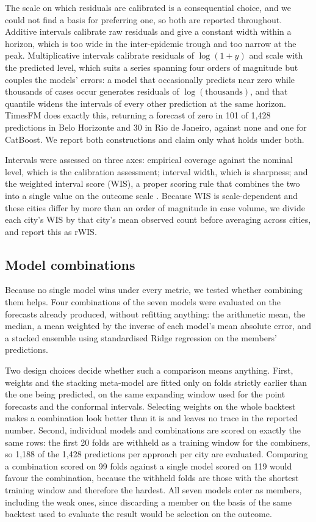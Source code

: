 \documentclass[11pt]{article}
\begin{document}
The scale on which residuals are calibrated is a consequential choice, and we could not
find a basis for preferring one, so both are reported throughout. Additive intervals
calibrate raw residuals and give a constant width within a horizon, which is too wide in
the inter-epidemic trough and too narrow at the peak. Multiplicative intervals calibrate
residuals of $\log(1+y)$ and scale with the predicted level, which suits a series
spanning four orders of magnitude but couples the models' errors: a model that
occasionally predicts near zero while thousands of cases occur generates residuals of
$\log(\text{thousands})$, and that quantile widens the intervals of every other
prediction at the same horizon. TimesFM does exactly this, returning a forecast of zero
in 101 of 1{,}428 predictions in Belo Horizonte and 30 in Rio de Janeiro, against none and
one for CatBoost. We report both constructions and claim only what holds under both.

Intervals were assessed on three axes: empirical coverage against the nominal level,
which is the calibration assessment; interval width, which is sharpness; and the weighted
interval score (WIS), a proper scoring rule that combines the two into a single value on
the outcome scale \citep{Bracher2021wis,Gneiting2007scoring}. Because WIS is
scale-dependent and these cities differ by more than an order of magnitude in case
volume, we divide each city's WIS by that city's mean observed count before averaging
across cities, and report this as rWIS.

\subsection{Model combinations}

Because no single model wins under every metric, we tested whether combining them helps.
Four combinations of the seven models were evaluated on the forecasts already produced,
without refitting anything: the arithmetic mean, the median, a mean weighted by the
inverse of each model's mean absolute error, and a stacked ensemble using standardised
Ridge regression on the members' predictions.

Two design choices decide whether such a comparison means anything. First, weights and the
stacking meta-model are fitted only on folds strictly earlier than the one being
predicted, on the same expanding window used for the point forecasts and the conformal
intervals. Selecting weights on the whole backtest makes a combination look better than it
is and leaves no trace in the reported number. Second, individual models and combinations
are scored on exactly the same rows: the first 20 folds are withheld as a training window
for the combiners, so 1{,}188 of the 1{,}428 predictions per approach per city are
evaluated. Comparing a combination scored on 99 folds against a single model scored on 119
would favour the combination, because the withheld folds are those with the shortest
training window and therefore the hardest. All seven models enter as members, including
the weak ones, since discarding a member on the basis of the same backtest used to
evaluate the result would be selection on the outcome.
\end{document}
